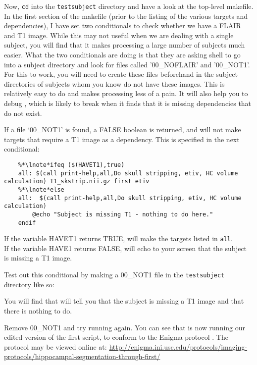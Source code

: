 Now, \texttt{cd} into the \texttt{testsubject} directory and have a look at the top-level makefile. In the first section of the makefile (prior to the listing of the various targets and dependencies), I have set two conditionals to check whether we have a FLAIR and T1 image. While this may not useful when we are dealing with a single subject, you will find that it makes processing a large number of subjects much easier. What the two conditionals are doing is that they are asking shell to go into a subject directory and look for files called '00_NOFLAIR' and '00_NOT1'. For this to work, you will need to create these files beforehand in the subject directories of subjects whom you know do not have these images. This is relatively easy to do and makes processing less of a pain. It will also help you to debug \maken{}, which is likely to break when it finds that it is missing dependencies that do not exist.  

	
If a file `00_NOT1' is found, a FALSE boolean is returned, and \maken{} will not make targets that require a T1 image as a dependency. This is specified in the next conditional:
\begin{lstlisting}
	%*\lnote*ifeq ($(HAVET1),true)
	all: $(call print-help,all,Do skull stripping, etiv, HC volume calculation) T1_skstrip.nii.gz first etiv
	%*\lnote*else
	all:  $(call print-help,all,Do skull stripping, etiv, HC volume calculation)
		@echo "Subject is missing T1 - nothing to do here."
	endif
\end{lstlisting}

If the variable HAVET1 returns TRUE, \maken{} will make the targets listed in \texttt{all}.\\
\indent{}If the variable HAVE1 returns FALSE, \maken{} will echo to your screen that the subject is missing a T1 image.

Test out this conditional by making a 00_NOT1 file in the \texttt{testsubject} directory like so:

You will find that \maken{} will tell you that the subject is missing a T1 image and that there is nothing to do.

Remove 00_NOT1 and try running \maken{} again. You can see that \maken{} is now running our edited version of the first script, to conform to the Enigma protocol \citep[see][]{Stein2012}. 
The protocol may be viewed online at: \url{http://enigma.ini.usc.edu/protocols/imaging-protocols/hippocampal-segmentation-through-first/}

